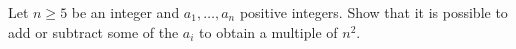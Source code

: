 Let $n \geq 5$ be an integer and $a_1, \ldots, a_n$ positive integers. Show that it is possible to add or subtract some of the $a_i$ to obtain a multiple of $n^2$.
